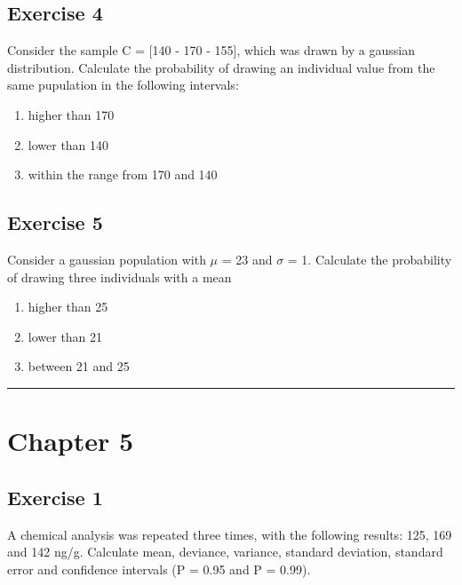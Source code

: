 \documentclass[a4paper,12pt,oneside]{book}
\providecommand{\tightlist}{%
  \setlength{\itemsep}{0pt}\setlength{\parskip}{0pt}}
\begin{document}
\hypertarget{exercise-4}{%
\subsection{Exercise 4}\label{exercise-4}}

Consider the sample C = {[}140 - 170 - 155{]}, which was drawn by a gaussian distribution. Calculate the probability of drawing an individual value from the same pupulation in the following intervals:

\begin{enumerate}
\def\labelenumi{\arabic{enumi}.}
\tightlist
\item
  higher than 170
\item
  lower than 140
\item
  within the range from 170 and 140
\end{enumerate}

\hypertarget{exercise-5}{%
\subsection{Exercise 5}\label{exercise-5}}

Consider a gaussian population with \(\mu\) = 23 and \(\sigma\) = 1. Calculate the probability of drawing three individuals with a mean

\begin{enumerate}
\def\labelenumi{\arabic{enumi}.}
\tightlist
\item
  higher than 25
\item
  lower than 21
\item
  between 21 and 25
\end{enumerate}

\begin{center}\rule{0.5\linewidth}{0.5pt}\end{center}

\hypertarget{chapter-5}{%
\section{Chapter 5}\label{chapter-5}}

\hypertarget{exercise-1-2}{%
\subsection{Exercise 1}\label{exercise-1-2}}

A chemical analysis was repeated three times, with the following results: 125, 169 and 142 ng/g. Calculate mean, deviance, variance, standard deviation, standard error and confidence intervals (P = 0.95 and P = 0.99).
\end{document}
